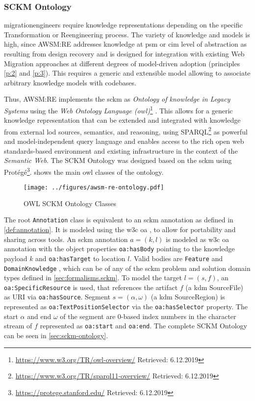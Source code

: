 \vspace{-10pt}
\subsubsection*{SCKM Ontology}
\glspl{migrationengineer} require knowledge representations depending on the specific \gls{Transformation} or \gls{Reengineering} process.
The variety of knowledge and models is high, since AWSM:RE addresses knowledge at \gls{psm} or \gls{cim} level of abstraction as resulting from design recovery and is designed for integration with existing \gls{Web Migration} approaches at different degrees of model-driven adoption (principles \cref{p:2} and \cref{p:3}).
This requires a generic and extensible model allowing to associate arbitrary knowledge models with  codebases.

Thus, AWSM:RE implements the \gls{sckm} as \emph{Ontology of knowledge in \glspl{Legacy System}} using the \emph{Web Ontology Language (\gls{owl})}\footnote{\url{https://www.w3.org/TR/owl-overview/} Retrieved: 6.12.2019} \autocite{Heil2016AWSM}.
This allows for a generic knowledge representation that can be extended and integrated with knowledge from external \gls{lod} sources, semantics, and reasoning, using SPARQL\footnote{\url{https://www.w3.org/TR/sparql11-overview/} Retrieved: 6.12.2019} as powerful and model-independent query language and enables access to the rich open \gls{web} standards-based environment and existing infrastructure in the context of the \emph{Semantic Web}.
The SCKM Ontology was designed based on the \gls{sckm} using Protégé\footnote{\url{https://protege.stanford.edu/} Retrieved: 6.12.2019}.
 shows the main \gls{owl} classes of the ontology.

\begin{figure}[h!]
\hypertarget{fig:ontology}{%
\centering
\texttt{[image: ../figures/awsm-re-ontology.pdf]}
\caption{OWL SCKM Ontology Classes}\label{fig:ontology}
}
\end{figure}
The root \texttt{Annotation} class is equivalent to an \gls{sckm} annotation as defined in \cref{def:annotation}.
It is modeled using the \gls{w3c} \gls{oa} \autocite{W3C2017OA}, to allow for portability and sharing across tools.
An \gls{sckm} annotation \(a=(k, l)\) is modeled as \gls{w3c} \gls{oa} annotation with the object properties \texttt{oa:hasBody} pointing to the knowledge payload \(k\) and \texttt{oa:hasTarget} to location \(l\).
Valid bodies are \texttt{Feature} and \texttt{DomainKnowledge} \autocite{Heil2016AWSM}, which can be of any of the \gls{sckm} problem and solution domain types defined in \cref{sec:formalisms.sckm}.
To model the target \(l = (s,f)\), an \texttt{oa:SpecificResource} is used, that references the  \gls{artifact} \(f\) (a \gls{kdm} SourceFile) as URI via \texttt{oa:hasSource}.
Segment \(s=(\alpha, \omega)\) (a \gls{kdm} SourceRegion) is represented as \texttt{oa:TextPositionSelector} via the \texttt{oa:hasSelector} property.
The start \(\alpha\) and end \(\omega\) of the segment are 0-based index numbers in the character stream of \(f\) represented as \texttt{oa:start} and \texttt{oa:end}.
The complete SCKM Ontology can be seen in \cref{sec:sckm-ontology}.

